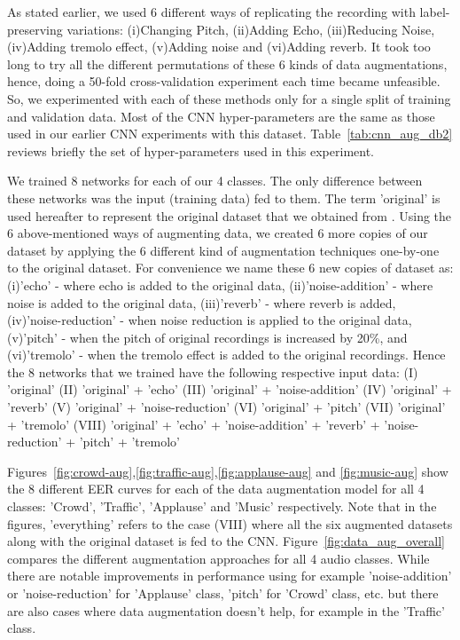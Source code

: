 As stated earlier, we used 6 different ways of replicating the recording with label-preserving variations: (i)Changing Pitch, (ii)Adding Echo, (iii)Reducing Noise, (iv)Adding tremolo effect, (v)Adding noise and (vi)Adding reverb. It took too long to try all the different permutations of these 6 kinds of data augmentations, hence, doing a 50-fold cross-validation experiment each time became unfeasible. So, we experimented with each of these methods only for a single split of training and validation data. Most of the CNN hyper-parameters are the same as those used in our earlier CNN experiments with this dataset. Table~\ref{tab:cnn_aug_db2} reviews briefly the set of hyper-parameters used in this experiment. 

We trained 8 networks for each of our 4 classes. The only difference between these networks was the input (training data) fed to them. The term 'original' is used hereafter to represent the original dataset that we obtained from \cite{kons2013audio}. Using the 6 above-mentioned ways of augmenting data, we created 6 more copies of our dataset by applying the 6 different kind of augmentation techniques one-by-one to the original dataset. For convenience we name these 6 new copies of dataset as: (i)'echo' - where echo is added to the original data, (ii)'noise-addition' - where noise is added to the original data, (iii)'reverb' - where reverb is added, (iv)'noise-reduction' - when noise reduction is applied to the original data, (v)'pitch' - when the pitch of original recordings is increased by 20\%, and (vi)'tremolo' - when the tremolo effect is added to the original recordings. Hence the 8 networks that we trained have the following respective input data:
(I) 'original'
(II) 'original' + 'echo'
(III) 'original' + 'noise-addition'
(IV) 'original' + 'reverb'
(V) 'original' + 'noise-reduction'
(VI) 'original' + 'pitch'
(VII) 'original' + 'tremolo'
(VIII) 'original' + 'echo' + 'noise-addition' + 'reverb' + 'noise-reduction' + 'pitch' + 'tremolo'

Figures~\ref{fig:crowd-aug},\ref{fig:traffic-aug},\ref{fig:applause-aug} and \ref{fig:music-aug} show the 8 different EER curves for each of the data augmentation model for all 4 classes: 'Crowd', 'Traffic', 'Applause' and 'Music' respectively. Note that in the figures, 'everything' refers to the case (VIII) where all the six augmented datasets along with the original dataset is fed to the CNN. Figure~\ref{fig:data_aug_overall} compares the different augmentation approaches for all 4 audio classes. While there are notable improvements in performance using for example 'noise-addition' or 'noise-reduction' for 'Applause' class, 'pitch' for 'Crowd' class, etc. but there are also cases where data augmentation doesn't help, for example in the 'Traffic' class.  


